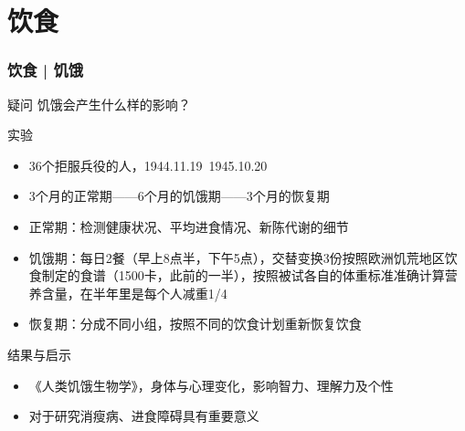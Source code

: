 \section{饮食}
\begin{frame}
  \frametitle{饮食 | 饥饿}
  \vspace{-0.5em}
  \begin{block}{疑问}
    饥饿会产生什么样的影响？
  \end{block}
  \vspace{-0.5em}
  \pause
  \begin{block}{实验}
    \begin{itemize}
      \item 36个拒服兵役的人，1944.11.19~1945.10.20
      \item 3个月的正常期——6个月的饥饿期——3个月的恢复期
      \item 正常期：检测健康状况、平均进食情况、新陈代谢的细节
      \item 饥饿期：每日2餐（早上8点半，下午5点），交替变换3份按照欧洲饥荒地区饮食制定的食谱（1500卡，此前的一半），按照被试各自的体重标准准确计算营养含量，在半年里是每个人减重1/4
      \item 恢复期：分成不同小组，按照不同的饮食计划重新恢复饮食
    \end{itemize}
  \end{block}
  \vspace{-0.5em}
  \pause
  \begin{block}{结果与启示}
    \begin{itemize}
      \item 《人类饥饿生物学》，身体与心理变化，影响智力、理解力及个性
      \item 对于研究消瘦病、进食障碍具有重要意义
    \end{itemize}
  \end{block}
\end{frame}

